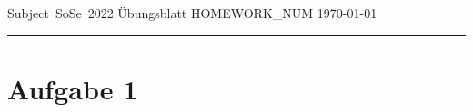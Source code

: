 \documentclass[a4paper, 11pt]{article}
\begin{document}
Subject~SoSe~2022
\hfill
{\Large
    Übungsblatt {{HOMEWORK_NUM}} %
}
\hfill
\today



\hrule

\section*{Aufgabe 1}
\end{document}
